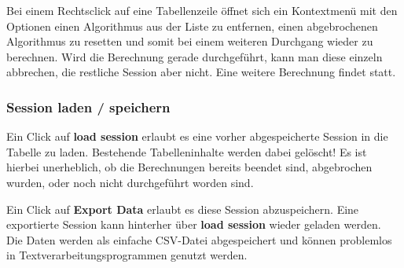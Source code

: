 \documentclass[
  a4paper,               %
  twoside,               %
  DIV=12,                %
  BCOR=8mm,              %
  headinclude=true,      %
  footinclude=false,     %
  numbers=noenddot,      %
  headheight=40pt,       %
  11pt]{scrartcl}        %
\begin{document}
Bei einem Rechtsclick auf eine Tabellenzeile öffnet sich ein Kontextmenü mit den Optionen einen Algorithmus aus der Liste zu entfernen, einen abgebrochenen Algorithmus zu resetten und somit bei einem weiteren Durchgang wieder zu berechnen. Wird die Berechnung gerade durchgeführt, kann man diese einzeln abbrechen, die restliche Session aber nicht. Eine weitere Berechnung findet statt.

\subsubsection{Session laden / speichern}
Ein Click auf \textbf{load session} erlaubt es eine vorher abgespeicherte Session in die Tabelle zu laden. Bestehende Tabelleninhalte werden dabei gelöscht!
Es ist hierbei unerheblich, ob die Berechnungen bereits beendet sind, abgebrochen wurden, oder noch nicht durchgeführt worden sind.
\vspace{\baselineskip}

Ein Click auf \textbf{Export Data} erlaubt es diese Session abzuspeichern.
Eine exportierte Session kann hinterher über \textbf{load session} wieder geladen werden. \\
Die Daten werden als einfache CSV-Datei abgespeichert und können problemlos in Textverarbeitungsprogrammen genutzt werden.
\end{document}
